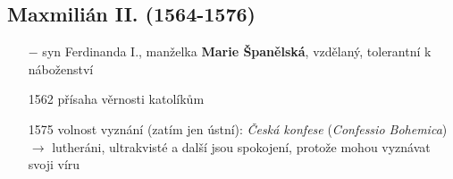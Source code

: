 \documentclass{article}
\begin{document}
\subsection*{Maxmilián II. (1564-1576)}
\begin{itemize}
    \vspace{-0.5em}
    \setlength\itemsep{0.15em}
    \item[$-$] syn Ferdinanda I., manželka \textbf{Marie Španělská}, vzdělaný, tolerantní k náboženství
    \item[1562] přísaha věrnosti katolíkům
    \item[1575] volnost vyznání (zatím jen ústní): \textit{Česká konfese} (\textit{Confessio Bohemica}) $\rightarrow$ lutheráni, ultrakvisté a další jsou spokojení, protože mohou vyznávat svoji víru
\end{itemize}
\end{document}
